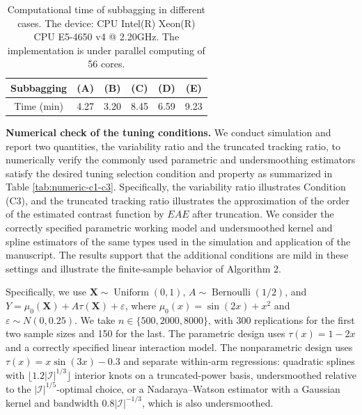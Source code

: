 \documentclass[11pt]{article}
\theoremstyle{referenceplain}
\theoremstyle{referencedefinition}
\theoremstyle{referenceremark}
\begin{document}
\begin{table}[H]
\centering
\scriptsize
\begin{tabular}{|c|c|c|c|c|c|}
\hline
Subbagging & (A)  & (B)  & (C)  & (D)  & (E)  \\ \hline
Time (min) & 4.27 & 3.20 & 8.45 & 6.59 & 9.23 \\ \hline
\end{tabular}
\caption{Computational time of subbagging in different cases. The device: CPU Intel(R) Xeon(R) CPU E5-4650 v4 @ 2.20GHz. The implementation is under parallel computing of 56 cores.}
\label{tab6}
\end{table}
\medskip\noindent\textbf{Numerical check of the tuning conditions.}
We conduct simulation and report two quantities, the variability ratio and the truncated tracking ratio, to numerically verify the commonly used parametric and undersmoothing estimators satisfy the desired tuning selection condition and property as summarized in Table \ref{tab:numeric-c1-c3}. Specifically, the variability ratio illustrates Condition (C3), and the truncated tracking ratio illustrates the approximation of the order of the estimated contrast function by $EAE$ after truncation. We consider the correctly specified parametric working model and undersmoothed kernel and spline estimators of the same types used in the simulation and application of the manuscript. The results support that the additional conditions are mild in these settings and illustrate the finite-sample behavior of Algorithm 2. 

Specifically, we use
$\mathbf X\sim\operatorname{Uniform}(0,1)$, $A\sim\operatorname{Bernoulli}(1/2)$, and
$Y=\mu_0(\mathbf X)+A\tau(\mathbf X)+\varepsilon$, where
$\mu_0(x)=\sin(2x)+x^2$ and $\varepsilon\sim N(0,0.25)$. We take
$n\in\{500,2000,8000\}$, with 300 replications for the first two sample sizes and 150 for the last. The parametric design uses
$\tau(x)=1-2x$ and a correctly specified linear interaction model. The nonparametric design uses
$\tau(x)=x\sin(3x)-0.3$ and separate within-arm regressions: quadratic splines with
$\lfloor1.2|\mathcal I|^{1/3}\rfloor$ interior knots on a truncated-power basis, undersmoothed relative to the $|\mathcal I|^{1/5}$-optimal choice, or a Nadaraya--Watson estimator with a Gaussian kernel and bandwidth
$0.8|\mathcal I|^{-1/3}$, which is also undersmoothed.
\end{document}
